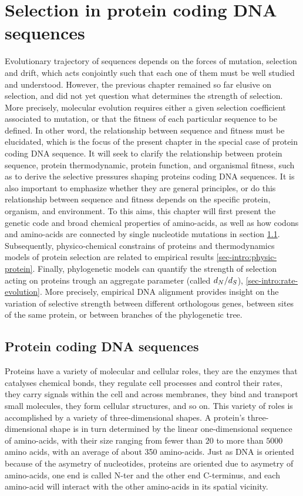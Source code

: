\chapter{Selection in protein coding {DNA} sequences}
{
	\hypersetup{linkcolor=GREYDARK}
	\minitoc
}
\label{sec:selection}

Evolutionary trajectory of sequences depends on the forces of mutation, selection and drift, which acts conjointly such that each one of them must be well studied and understood.
However, the previous chapter remained so far elusive on selection, and did not yet question what determines the strength of selection.
More precisely, molecular evolution requires either a given selection coefficient associated to mutation, or that the fitness of each particular sequence to be defined.
In other word, the relationship between sequence and fitness must be elucidated, which is the focus of the present chapter in the special case of protein coding \acrshort{DNA} sequence.
It will seek to clarify the relationship between protein sequence, protein thermodynamic, protein function, and organismal fitness, such as to derive the selective pressures shaping proteins coding \acrshort{DNA} sequences.
It is also important to emphasize whether they are general principles, or do this relationship between sequence and fitness depends on the specific protein, organism, and environment.
To this aims, this chapter will first present the genetic code and broad chemical properties of amino-acids, as well as how codons and amino-acids are connected by single nucleotide mutations in section \ref{sec-intro:genetic-code}.
Subsequently, physico-chemical constrains of proteins and thermodynamics models of protein selection are related to empirical results \ref{sec-intro:physic-protein}.
Finally, phylogenetic models can quantify the strength of selection acting on proteins trough an aggregate parameter (called $d_N / d_S$), \ref{sec-intro:rate-evolution}.
More precisely, empirical \acrshort{DNA} alignment provides insight on the variation of selective strength between different orthologous genes, between sites of the same protein, or between branches of the phylogenetic tree.

\section{Protein coding {DNA} sequences}
\label{sec-intro:genetic-code}
Proteins have a variety of molecular and cellular roles, they are the enzymes that catalyses chemical bonds, they regulate cell processes and control their rates, they carry signals within the cell and across membranes, they bind and transport small molecules, they form cellular structures, and so on.
This variety of roles is accomplished by a variety of three-dimensional shapes.
A protein's three-dimensional shape is in turn determined by the linear one-dimensional sequence of amino-acids, with their size ranging from fewer than $20$ to more than $5000$ amino acids, with an average of about 350 amino-acids.
Just as \acrshort{DNA} is oriented because of the asymetry of nucleotides, proteins are oriented due to asymetry of amino-acids, one end is called \gls{N-ter} and the other end C-terminus, and each amino-acid will interact with the other amino-acids in its spatial vicinity. 


